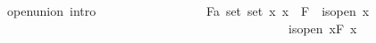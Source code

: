 \documentclass[12pt]{scrartcl}
\begin{document}
\begin{isabelle}
\ \ \ \ \ open{\isacharunderscore}{\kern0pt}union\ {\isacharbrackleft}{\kern0pt}intro{\isacharbrackright}{\kern0pt}{\isacharcolon}{\kern0pt}\ \isanewline
\ \ \ \ \ \ \ \ \ \ \ \ \ \ \ \ {\isachardoublequoteopen}{\isasymAnd}F{\isacharcolon}{\kern0pt}{\isacharcolon}{\kern0pt}{\isacharparenleft}{\kern0pt}{\isacharprime}{\kern0pt}a\ set{\isacharparenright}{\kern0pt}\ set{\isachardot}{\kern0pt}\ {\isacharparenleft}{\kern0pt}{\isasymAnd}x{\isachardot}{\kern0pt}\ x\ {\isasymin}\ F\ {\isasymLongrightarrow}\ is{\isacharunderscore}{\kern0pt}open\ x{\isacharparenright}{\kern0pt}\isanewline
\ \ \ \ \ \ \ \ \ \ \ \ \ \ \ \ \ \ \ \ \ \ \ \ \ \ \ \ \ \ \ \ \ \ \ \ \ \ \ \ \ \ \ \ \ \ \ \ \ {\isasymLongrightarrow}\ is{\isacharunderscore}{\kern0pt}open\ {\isacharparenleft}{\kern0pt}{\isasymUnion}x{\isasymin}F{\isachardot}{\kern0pt}\ x{\isacharparenright}{\kern0pt}{\isachardoublequoteclose}
\end{isabelle}
\end{document}
